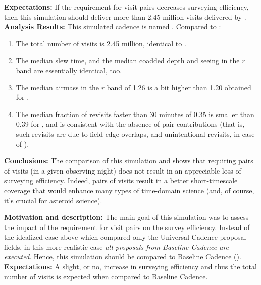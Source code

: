 {\bf Expectations:} If the requirement for visit pairs decreases
surveying efficiency, then this simulation should deliver more than
2.45 million visits delivered by . \\

{\bf Analysis Results:} This simulated cadence is named . Compared
to :
\begin{enumerate}
\item The total number of visits is 2.45 million, identical to .
\item The median slew time, and the median coadded depth and seeing in the $r$ band
are essentially identical, too.
\item The median airmass in the $r$ band of 1.26 is a bit higher than 1.20 obtained
for .
\item The median fraction of revisits faster than 30 minutes of 0.35 is smaller than 0.39
for , and is consistent with the absence of pair contributions (that is,
such revisits are due to field edge overlaps, and unintentional revisits, in case of ).
\end{enumerate}

{\bf Conclusions:} The comparison of this simulation and
 shows that requiring pairs of visits (in a
given observing night) does not result in an appreciable loss of
surveying efficiency. Indeed, pairs of visits result in a better
short-timescale coverage that would enhance many types of time-domain
science (and, of course, it's crucial for asteroid science).




{\bf Motivation and description:} The main goal of this simulation was
to assess the impact of the requirement for visit pairs on the survey
efficiency. Instead of the idealized case above which compared only
the Universal Cadence proposal fields, in this more realistic case
{\it all proposals from Baseline Cadence are executed}. Hence, this
simulation should be compared to Baseline Cadence
(). \\

{\bf Expectations:} A slight, or no, increase in surveying efficiency
and thus the total number of visits is expected when compared to
Baseline Cadence. \\

